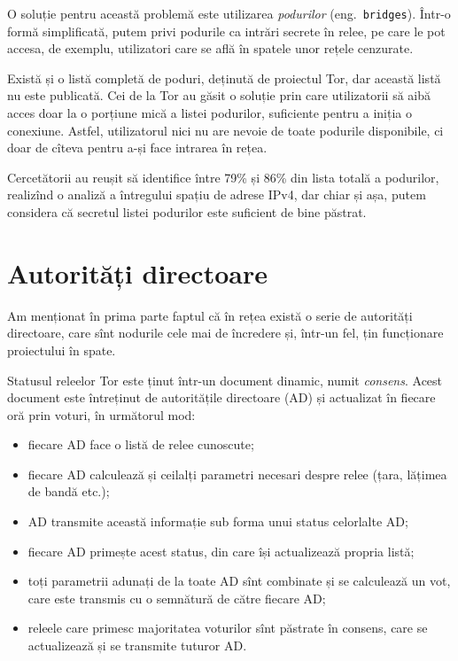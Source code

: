 O soluție pentru această problemă este utilizarea \emph{podurilor} (eng.\ \texttt{bridges}).
Într-o formă simplificată, putem privi podurile ca intrări secrete în relee, pe care le
pot accesa, de exemplu, utilizatori care se află în spatele unor rețele cenzurate.

Există și o listă completă de poduri, deținută de proiectul Tor, dar această listă
nu este publicată. Cei de la Tor au găsit o soluție prin care utilizatorii să aibă
acces doar la o porțiune mică a listei podurilor, suficiente pentru a iniția o conexiune.
Astfel, utilizatorul nici nu are nevoie de toate podurile disponibile, ci doar de cîteva
pentru a-și face intrarea în rețea.

Cercetătorii au reușit să identifice între 79\% și 86\% din lista totală a podurilor,
realizînd o analiză a întregului spațiu de adrese IPv4, dar chiar și așa, putem considera
că secretul listei podurilor este suficient de bine păstrat.

\section{Autorități directoare} 

\indent\indent Am menționat în prima parte faptul că în rețea există o serie
de autorități directoare, care sînt nodurile cele mai de încredere și, într-un fel,
țin funcționare proiectului în spate.

Statusul releelor Tor este ținut într-un document dinamic, numit \emph{consens}. 
Acest document este întreținut de autoritățile directoare (AD) și actualizat
în fiecare oră prin voturi, în următorul mod:
\begin{itemize}
  \item fiecare AD face o listă de relee cunoscute;
  \item fiecare AD calculează și ceilalți parametri necesari despre relee (țara,
    lățimea de bandă etc.);
  \item AD transmite această informație sub forma unui status celorlalte AD;
  \item fiecare AD primește acest status, din care își actualizează propria
    listă;
  \item toți parametrii adunați de la toate AD sînt combinate și se calculează
    un vot, care este transmis cu o semnătură de către fiecare AD;
  \item releele care primesc majoritatea voturilor sînt păstrate în consens, care
    se actualizează și se transmite tuturor AD.
\end{itemize}

